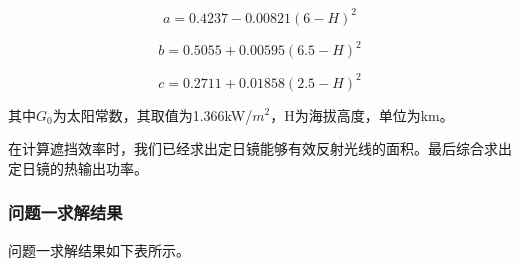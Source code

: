 \documentclass[withoutpreface,bwprint]{cumcmthesis} %
\begin{document}
 \begin{equation}
    a=0.4237-0.00821(6-H)^2
\end{equation}

\begin{equation}
    b=0.5055+0.00595(6.5-H)^2 
\end{equation}

\begin{equation}
    c=0.2711+0.01858(2.5-H)^2
\end{equation}

其中$G_{0}$为太阳常数，其取值为1.366kW/$m^2$，H为海拔高度，单位为km。

在计算遮挡效率时，我们已经求出定日镜能够有效反射光线的面积。最后综合求出定日镜的热输出功率。

\subsubsection{问题一求解结果}

问题一求解结果如下表所示。
\end{document}
